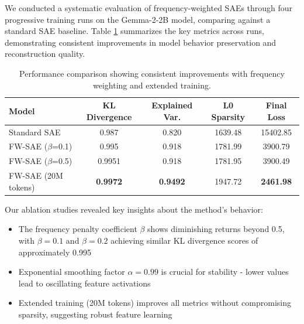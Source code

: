 \documentclass{article} %
\begin{document}
We conducted a systematic evaluation of frequency-weighted SAEs through four progressive training runs on the Gemma-2-2B model, comparing against a standard SAE baseline. Table \ref{tab:performance} summarizes the key metrics across runs, demonstrating consistent improvements in model behavior preservation and reconstruction quality.

\begin{table}[h]
\centering
\begin{tabular}{lcccc}
\toprule
Model & KL Divergence & Explained Var. & L0 Sparsity & Final Loss \\
\midrule
Standard SAE & 0.987 & 0.820 & 1639.48 & 15402.85 \\
FW-SAE ($\beta$=0.1) & 0.995 & 0.918 & 1781.99 & 3900.79 \\
FW-SAE ($\beta$=0.5) & 0.9951 & 0.918 & 1781.95 & 3900.49 \\
FW-SAE (20M tokens) & \textbf{0.9972} & \textbf{0.9492} & 1947.72 & \textbf{2461.98} \\
\bottomrule
\end{tabular}
\caption{Performance comparison showing consistent improvements with frequency weighting and extended training.}
\label{tab:performance}
\end{table}

Our ablation studies revealed key insights about the method's behavior:

\begin{itemize}
\item The frequency penalty coefficient $\beta$ shows diminishing returns beyond 0.5, with $\beta=0.1$ and $\beta=0.2$ achieving similar KL divergence scores of approximately 0.995
\item Exponential smoothing factor $\alpha=0.99$ is crucial for stability - lower values lead to oscillating feature activations
\item Extended training (20M tokens) improves all metrics without compromising sparsity, suggesting robust feature learning
\end{itemize}
\end{document}
